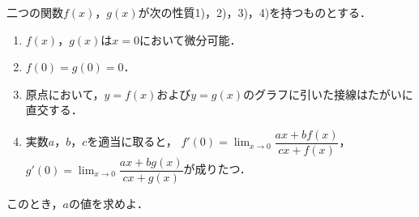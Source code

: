 \documentclass[../../main.tex]{subfiles}
\begin{document}
二つの関数$f(x)$，$g(x)$が次の性質1)，2)，3)，4)を持つものとする．
\begin{enumerate}
\item $f(x)$，$g(x)$は$x=0$において微分可能．
\item $f(0)=g(0)=0$．
\item 原点において，$y=f(x)$および$y=g(x)$のグラフに引いた接線はたがいに直交する．
\item 実数$a$，$b$，$c$を適当に取ると，
$\displaystyle f'(0)=\lim_{x \to 0}\dfrac{ax+bf(x)}{cx+f(x)}$，
$\displaystyle g'(0)=\lim_{x \to 0}\dfrac{ax+bg(x)}{cx+g(x)}$が成りたつ．
\end{enumerate}
このとき，$a$の値を求めよ．
\end{document}
